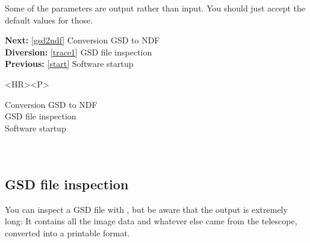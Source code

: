    Some of the parameters are output rather than input. You should just accept
   the default values for those.

\begin{latexonly}
{\bf Next:} \ref{gsd2ndf} Conversion GSD to NDF\\
{\bf Diversion:} \ref{trace1} GSD file inspection\\
{\bf Previous:} \ref{start} Software startup\\
\end{latexonly}

\begin{htmlonly}
\begin{rawhtml} <HR><P> \end{rawhtml}
{\bf {}} Conversion GSD to NDF\\
{\bf {}} GSD file inspection\\
{\bf {}} Software startup\\
{\bf {}}\\
{\bf {}}\\
\end{htmlonly}


\subsection{\label{trace1}GSD file inspection}

   You can inspect a GSD file with
{\tt {}},
   but be aware that the output is extremely long: It contains all the
   image data and whatever else came from the telescope, converted into
   a printable format.

